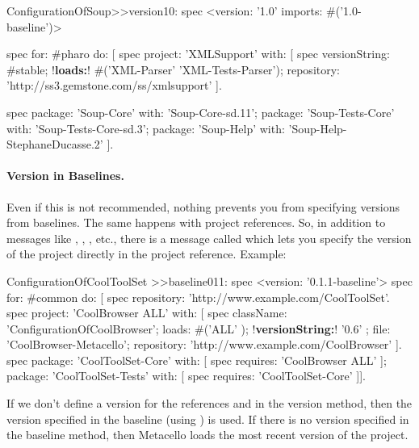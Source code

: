 \documentclass[a4paper,10pt,twoside]{book}
\begin{document}
\begin{code}{}
ConfigurationOfSoup>>version10: spec
	<version: '1.0' imports:  #('1.0-baseline')>

	spec for: #pharo do: [
		spec project: 'XMLSupport' with: [
                       spec
                          versionString: #stable;
                          !\textbf{loads:}! #('XML-Parser' 'XML-Tests-Parser');
                          repository: 'http://ss3.gemstone.com/ss/xmlsupport' ].

	spec
			package: 'Soup-Core' with: 'Soup-Core-sd.11';
			package: 'Soup-Tests-Core' with: 'Soup-Tests-Core-sd.3';
			package: 'Soup-Help' with: 'Soup-Help-StephaneDucasse.2' ].
\end{code}



\paragraph{Version in Baselines.} Even if this is not recommended, nothing prevents you from specifying versions from baselines. The same happens with project references. So, in addition to messages like , , , etc., there is a message called  which lets you specify the version of the project directly in the project reference. Example:

\begin{code}{}
ConfigurationOfCoolToolSet >>baseline011: spec
       <version: '0.1.1-baseline'>
       spec for: #common do: [
              spec repository: 'http://www.example.com/CoolToolSet'.
              spec project: 'CoolBrowser ALL' with: [
                            spec
                                   className: 'ConfigurationOfCoolBrowser';
                                   loads: #('ALL' );
                                   !\textbf{versionString:}! '0.6' ;
                                   file: 'CoolBrowser-Metacello';
                                   repository: 'http://www.example.com/CoolBrowser' ].
              spec
                     package: 'CoolToolSet-Core' with: [ spec requires: 'CoolBrowser ALL' ];
                     package: 'CoolToolSet-Tests' with: [ spec requires: 'CoolToolSet-Core' ]].
\end{code}

If we don't define a version for the references   and  in the version method, then the version specified in the baseline (using ) is used.  If there is no version specified in the baseline method, then Metacello loads the most recent version of the project.
\end{document}
